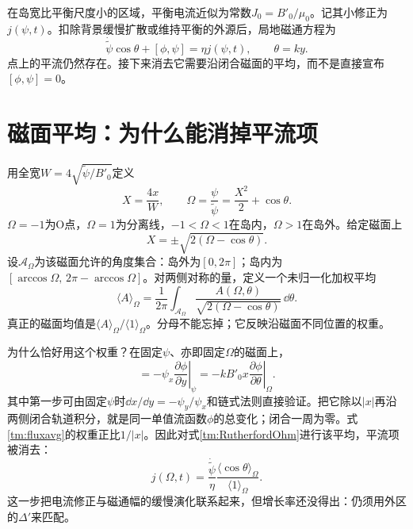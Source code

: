 在岛宽比平衡尺度小的区域，平衡电流近似为常数$J_0=B'_0/\mu_0$。记其小修正为$j(\psi,t)$。扣除背景缓慢扩散或维持平衡的外源后，局地磁通方程为
\begin{equation}
 \dot{\widetilde\psi}\cos\theta+[\phi,\psi]=\eta j(\psi,t),
 \qquad \theta=ky.
 \label{tm:RutherfordOhm}
\end{equation}
点上的平流仍然存在。接下来消去它需要沿闭合磁面的平均，而不是直接宣布$[\phi,\psi]=0$。

\section{磁面平均：为什么能消掉平流项}
用全宽$W=4\sqrt{\widetilde\psi/B'_0}$定义
\begin{equation}
 X=\frac{4x}{W},\qquad
 \Omega=\frac{\psi}{\widetilde\psi}=\frac{X^2}{2}+\cos\theta.
\end{equation}
$\Omega=-1$为O点，$\Omega=1$为分离线，$-1<\Omega<1$在岛内，$\Omega>1$在岛外。给定磁面上
\begin{equation}
 X=\pm\sqrt{2(\Omega-\cos\theta)}.
\end{equation}
设$\mathcal A_\Omega$为该磁面允许的角度集合：岛外为$[0,2\pi]$；岛内为$[\arccos\Omega,\,2\pi-\arccos\Omega]$。对两侧对称的量，定义一个未归一化加权平均
\begin{equation}
 \langle A\rangle_\Omega
 =\frac1{2\pi}\int_{\mathcal A_\Omega}
 \frac{A(\Omega,\theta)}{\sqrt{2(\Omega-\cos\theta)}}\,\dd\theta.
 \label{tm:fluxavg}
\end{equation}
真正的磁面均值是$\langle A\rangle_\Omega/\langle1\rangle_\Omega$。分母不能忘掉；它反映沿磁面不同位置的权重。

为什么恰好用这个权重？在固定$\psi$、亦即固定$\Omega$的磁面上，
\begin{equation}
 [\phi,\psi]
 =-\psi_x\left.\frac{\partial\phi}{\partial y}\right|_\psi
 =-kB'_0x\left.\frac{\partial\phi}{\partial\theta}\right|_\Omega.
\end{equation}
其中第一步可由固定$\psi$时$\dd x/\dd y=-\psi_y/\psi_x$和链式法则直接验证。把它除以$|x|$再沿两侧闭合轨道积分，就是同一单值流函数$\phi$的总变化；闭合一周为零。式\eqref{tm:fluxavg}的权重正比$1/|x|$。因此对式\eqref{tm:RutherfordOhm}进行该平均，平流项被消去：
\begin{equation}
 \boxed{
 j(\Omega,t)=\frac{\dot{\widetilde\psi}}{\eta}
 \frac{\langle\cos\theta\rangle_\Omega}{\langle1\rangle_\Omega}.}
 \label{tm:Rutherfordj}
\end{equation}
这一步把电流修正与磁通幅的缓慢演化联系起来，但增长率还没得出：仍须用外区的$\Delta'$来匹配。

